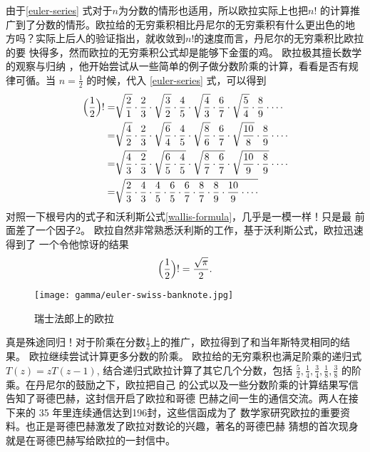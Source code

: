 {由于\eqref{euler-series} 式对于$n$为分数的情形也适用，所以欧拉实际上也把$n!$
的计算推广到了分数的情形。欧拉给的无穷乘积相比丹尼尔的无穷乘积有什么更出色的地
方吗？实际上后人的验证指出，就收敛到$n!$的速度而言，丹尼尔的无穷乘积比欧拉的要
快得多，然而欧拉的无穷乘积公式却是能够下金蛋的鸡。 欧拉极其擅长数学的观察与归纳
，他开始尝试从一些简单的例子做分数阶乘的计算，看看是否有规律可循。当
$n=\frac{1}{2}$ 的时候，代入 \eqref{euler-series} 式，可以得到
\begin{align*}
\Bigl(\frac{1}{2}\Bigr)! 
= & \sqrt{\frac{2}{1}} \cdot \frac{2}{3} \cdot \sqrt{\frac{3}{2}} \cdot \frac{4}{5} 
    \cdot \sqrt{\frac{4}{3}} \cdot \frac{6}{7} \cdot \sqrt{\frac{5}{4}} \cdot \frac{8}{9} 
    \cdot \cdots  \\
= & \sqrt{\frac{4}{2}} \cdot \frac{2}{3} \cdot \sqrt{\frac{6}{4}} \cdot \frac{4}{5}
    \cdot \sqrt{\frac{8}{6}} \cdot \frac{6}{7} \cdot \sqrt{\frac{10}{8}} \cdot \frac{8}{9} 
    \cdot \cdots  \\
= & \sqrt{\frac{4}{3} \cdot \frac{2}{3}} \cdot \sqrt{\frac{6}{5} \cdot \frac{4}{5}}
    \cdot \sqrt{\frac{8}{7} \cdot \frac{6}{7}} \cdot \sqrt{\frac{10}{9} \cdot \frac{8}{9}} 
    \cdot \cdots  \\
= & \sqrt{\frac{2}{3} \cdot \frac{4}{3} \cdot \frac{4}{5} \cdot \frac{6}{5}
    \cdot \frac{6}{7} \cdot \frac{8}{7} \cdot \frac{8}{9} \cdot \frac{10}{9} \cdot \cdots } 
\end{align*}
对照一下根号内的式子和沃利斯公式\eqref{wallis-formula}，几乎是一模一样！只是最
前面差了一个因子2。 欧拉自然非常熟悉沃利斯的工作，基于沃利斯公式，欧拉迅速得到了
一个令他惊讶的结果
$$ \Bigl(\frac{1}{2}\Bigr)! = \frac{\sqrt{\pi}}{2} .$$

\begin{figure}[htbp]
\centering
\texttt{[image: gamma/euler-swiss-banknote.jpg]}
\caption{瑞士法郎上的欧拉}
\end{figure}

真是殊途同归！对于阶乘在分数$\frac{1}{2}$上的推广，欧拉得到了和当年斯特灵相同的结
果。 欧拉继续尝试计算更多分数的阶乘。 欧拉给的无穷乘积也满足阶乘的递归式$T(z)
= z T(z-1)$, 结合递归式欧拉计算了其它几个分数，包括 $\frac{5}{2}, \frac{1}{4},
\frac{3}{4}, \frac{1}{8}, \frac{3}{8} $ 的阶乘。在丹尼尔的鼓励之下，欧拉把自己
的公式以及一些分数阶乘的计算结果写信告知了哥德巴赫，这封信开启了欧拉和哥德
巴赫之间一生的通信交流。两人在接下来的 35 年里连续通信达到196封，这些信函成为了
数学家研究欧拉的重要资料。也正是哥德巴赫激发了欧拉对数论的兴趣，著名的哥德巴赫
猜想的首次现身就是在哥德巴赫写给欧拉的一封信中。

}
